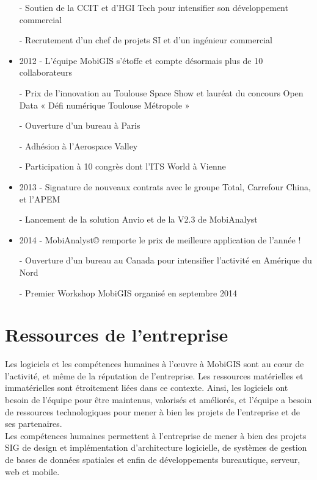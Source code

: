 \begin{itemize}
		- Soutien de la CCIT et d’HGI Tech pour intensifier son développement commercial 
    
		- Recrutement d’un chef de projets SI et d’un ingénieur commercial 
\\
\item 2012 
    - L’équipe MobiGIS s’étoffe et compte désormais plus de 10 collaborateurs 
    
		- Prix de l’innovation au Toulouse Space Show et lauréat du concours Open Data « Défi numérique Toulouse Métropole » 
    
		- Ouverture d’un bureau à Paris 
    
		- Adhésion à l’Aerospace Valley 
    
		- Participation à 10 congrès dont l’ITS World à Vienne 
\\
\item 2013 
    - Signature de nouveaux contrats avec le groupe Total, Carrefour China, et l’APEM 
    
		- Lancement de la solution Anvio et de la V2.3 de MobiAnalyst 
\\
\item 2014
    - MobiAnalyst© remporte le prix de meilleure application de l'année !
    
		- Ouverture d'un bureau au Canada pour intensifier l'activité en Amérique du Nord
    
		- Premier Workshop MobiGIS organisé en septembre 2014 

\end{itemize}



\section{Ressources de l'entreprise}

Les logiciels et les compétences humaines à l’\oe uvre à MobiGIS sont au c\oe ur de l’activité, et même de la réputation de l’entreprise. Les ressources matérielles et immatérielles sont étroitement liées dans ce contexte. Ainsi, les logiciels ont besoin de l’équipe pour être maintenus, valorisés et améliorés, et l’équipe a besoin de ressources technologiques pour mener à bien les projets de l’entreprise et de ses partenaires.\\ 

Les compétences humaines permettent à l’entreprise de mener à bien des projets SIG de design et implémentation d’architecture logicielle, de systèmes de gestion de bases de données spatiales et enfin de développements bureautique, serveur, web et mobile. \\

